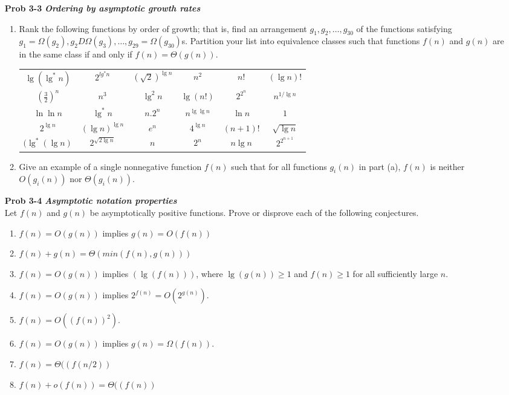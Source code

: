 \documentclass[fontsize=12pt,paper=a4]{book}
\begin{document}
\begin{enumerate}
	\item[\textbf{Prob 3-3}]
		\textbf{\textit{Ordering by asymptotic growth rates}}
			\begin{enumerate}
				\item Rank the following functions by order of growth; that is, find an arrangement $g_1, g_2, \dots , g_30$ of the functions satisfying $g_1 = \Omega (g_2), g_2 D \Omega (g_3), \dots,g_29 = \Omega (g_30)$s. Partition your list into equivalence classes such that functions $f(n)$ and $g(n)$ are in the same class if and only if $f(n) = \Theta(g(n))$.
				\begin{tabular}{c c c c c c}
				$\lg(\lg^* n)$ & $2^{lg^* n}$ & $(\sqrt{2})^{\lg n}$ & $n^2$ & $n!$ & $(\lg n)!$ \\				
				$(\frac{3}{2})^n$& $n^3$ & $\lg^2 n$ & $\lg(n!)$ & $2^{2^n}$ & $n^{1/\lg n}$ \\				
				$\ln \ln n$& $\lg^* n$ & $n . 2^n$ & $n^{\lg \lg n}$ & $\ln n$ & $1$ \\				
				$2^{\lg n}$& $(\lg n)^{\lg n}$ & $e^n$ & $4^{\lg n}$ & $(n+1)!$ & $\sqrt{\lg n}$ \\				
				$(\lg^*(\lg n)$& $2^{\sqrt{2 \lg n}}$ & $n$ & $2^n$ & $n \lg n$ & $2^{2^{n+1}}$ \\
				\end{tabular}				
				\item Give an example of a single nonnegative function $f(n)$ such that for all functions $g_i(n)$ in part (a), $f(n)$ is neither $O(g_i(n))$ nor $\Theta(g_i(n))$.				
			\end{enumerate}
		
	\item[\textbf{Prob 3-4}]
		\textbf{\textit{Asymptotic notation properties}}\\
			Let $f(n)$ and $g(n)$ be asymptotically positive functions. Prove or disprove each of the following conjectures.
			\begin{enumerate}
				\item $f(n) = O(g(n))$ implies $g(n) = O(f(n))$
				\item $f(n) + g(n) = \Theta(min(f(n), g(n)))$
				\item $f(n) = O(g(n))$ implies $(\lg(f(n)))$, where $\lg(g(n)) \geq 1$ and $f(n) \geq 1$ for all sufficiently large $n$.
				\item $f(n) = O(g(n))$ implies $2^{f(n)} = O(2^{g(n)})$.
				\item $f(n) = O((f(n))^2)$.
				\item $f(n) = O(g(n))$ implies $g(n) = \Omega(f(n))$.
				\item $f(n) = \Theta((f(n/2))$
				\item $f(n) + o(f(n)) = \Theta((f(n))$
			\end{enumerate}
			

\end{enumerate}
\end{document}
